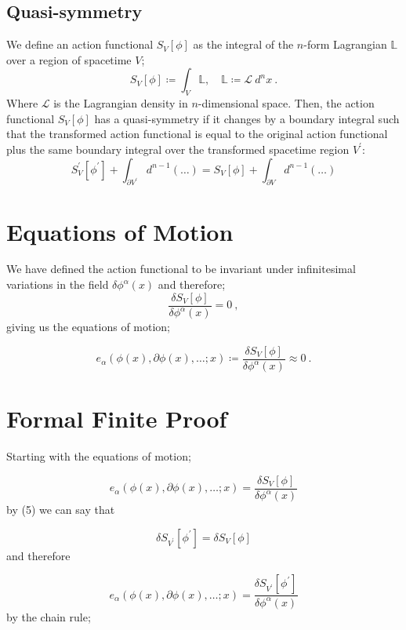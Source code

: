 \documentclass{article}
\begin{document}
\subsection{Quasi-symmetry}
We define an action functional $S_V\left[\phi\right]$ as the integral of the $n$-form Lagrangian $\mathbb{L}$ over a region of spacetime $V$;
\begin{equation}
	S_V\left[ \phi \right] \coloneqq \int_V \mathbb{L}, \quad \mathbb{L} \coloneqq \mathcal{L}\ d^nx\ .
\end{equation}
Where $\mathcal{L}$ is the Lagrangian density in $n$-dimensional space. Then, the action functional $S_V\left[\phi\right]$ has a quasi-symmetry if it changes by a boundary integral such that the transformed action functional is equal to the original action functional plus the same boundary integral over the transformed spacetime region $V^\prime$:
\begin{equation}
	S_V^\prime \left[\phi^\prime\right] + \int_{\partial V^\prime} d^{n-1} (\dots) = S_V \left[\phi\right] + \int_{\partial V} d^{n-1} (\dots)
\end{equation}

\section{Equations of Motion}
We have defined the action functional to be invariant under infinitesimal variations in the field $\delta \phi^\alpha(x)$ and therefore;
\[
	\frac{\delta S_V[\phi]}{\delta \phi^{\alpha}(x)} = 0 \ ,
\]
giving us the equations of motion;

\begin{equation}
	e_{\alpha}(\phi(x),\partial\phi(x),\ldots ; x) \coloneqq \frac{\delta S_V[\phi]}{\delta \phi^{\alpha}(x)} \approx 0 \ .
\end{equation}

\section{Formal Finite Proof}
Starting with the equations of motion;

\[
	e_{\alpha}(\phi(x),\partial\phi(x),\ldots ; x) = \frac{\delta S_V[\phi]}{\delta \phi^{\alpha}(x)}
\]
by (5) we can say that

\[
	\delta S_{V^\prime} \left[\phi^\prime\right] = \delta S_{V} \left[\phi\right]
\]
and therefore

\[
	e_{\alpha}(\phi(x),\partial\phi(x),\ldots ; x) = \frac{\delta S_{V^\prime} \left[\phi^\prime\right]}{\delta \phi^{\alpha}(x)}
\]
by the chain rule;
\end{document}

